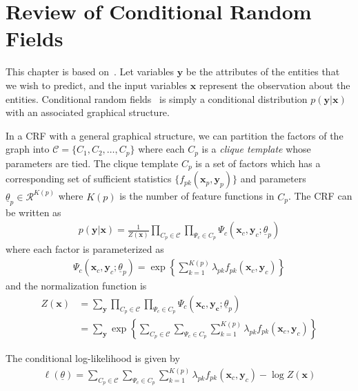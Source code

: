 \chapter{Review of Conditional Random Fields}\label{app:crf}
This chapter is based on~\cite{sutton06}. Let variables $\mathbf{y}$ be the
attributes of the entities that we wish to predict, and the input variables $\mathbf{x}$ represent the
observation about the entities. Conditional random fields~\cite{lafferty01} is
simply a conditional distribution $p(\mathbf{y}|\mathbf{x})$ with an
associated graphical structure. 

In a CRF with a general graphical structure, we can partition the factors of the
graph into $\mathcal{C}=\{C_1, C_2, \ldots, C_p\}$ where each $C_p$ is a 
\textit{clique template} whose parameters are tied.
The clique template $C_p$ is a set of factors which has a corresponding set of sufficient
statistics $\{f_{pk}(\mathbf{x}_p, \mathbf{y}_p)\}$ and parameters
$\underline{\theta}_p\in \mathcal{R}^{K(p)}$ where $K(p)$ is the number of
feature functions in $C_p$.
The CRF can be written as
\begin{align*}
p(\mathbf{y}|\mathbf{x}) = \frac{1}{Z(\mathbf{x})}\prod_{C_p\in
\mathcal{C}}\prod_{\Psi_c\in C_p}\Psi_c(\mathbf{x}_c,
\mathbf{y}_c;\underline{\theta}_p)
\end{align*}
where each factor is parameterized as
\begin{align*}
\Psi_c(\mathbf{x}_c, \mathbf{y}_c;
\underline{\theta}_p) =
\exp\left\{\sum_{k=1}^{K(p)}\lambda_{pk}f_{pk}(\mathbf{x}_c,
\mathbf{y}_c)\right\}
\end{align*}
and the normalization function is
\begin{align*}
Z(\mathbf{x})
&= \sum_{\mathbf{y}}\prod_{C_p\in\mathcal{C}}\prod_{\Psi_c\in
C_p}\Psi_c(\mathbf{x_c}, \mathbf{y_c}; \underline{\theta}_p)\\
&= \sum_{\mathbf{y}}\exp\left\{\sum_{C_p\in\mathcal{C}}\sum_{\Psi_c\in
C_p}\sum_{k=1}^{K(p)}\lambda_{pk}f_{pk}(\mathbf{x}_c,
\mathbf{y}_c)\right\}
\end{align*}

The conditional log-likelihood is given by
\begin{align*}
\ell(\underline{\theta}) = \sum_{C_p\in\mathcal{C}}\sum_{\Psi_c\in
C_p}\sum_{k=1}^{K(p)}\lambda_{pk}f_{pk}(\mathbf{x}_c, \mathbf{y}_c) - \log Z(\mathbf{x})
\end{align*}

